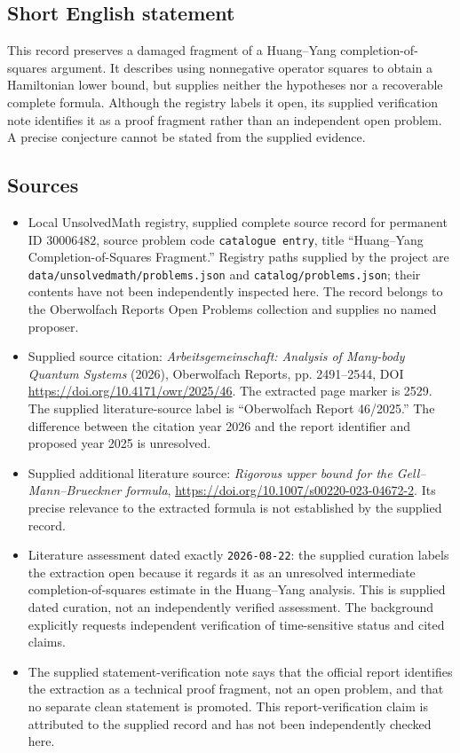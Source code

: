 \documentclass[11pt]{article}
\begin{document}
\subsection{Short English statement}
This record preserves a damaged fragment of a Huang--Yang completion-of-squares argument. It describes using nonnegative operator squares to obtain a Hamiltonian lower bound, but supplies neither the hypotheses nor a recoverable complete formula. Although the registry labels it open, its supplied verification note identifies it as a proof fragment rather than an independent open problem. A precise conjecture cannot be stated from the supplied evidence.
\subsection{Sources}
\begin{itemize}
\item Local UnsolvedMath registry, supplied complete source record for permanent ID \(30006482\), source problem code \texttt{catalogue entry}, title ``Huang--Yang Completion-of-Squares Fragment.'' Registry paths supplied by the project are \texttt{data/unsolvedmath/problems.json} and \texttt{catalog/problems.json}; their contents have not been independently inspected here. The record belongs to the Oberwolfach Reports Open Problems collection and supplies no named proposer.
\item Supplied source citation: \emph{Arbeitsgemeinschaft: Analysis of Many-body Quantum Systems} (2026), Oberwolfach Reports, pp. 2491--2544, DOI \url{https://doi.org/10.4171/owr/2025/46}. The extracted page marker is 2529. The supplied literature-source label is ``Oberwolfach Report 46/2025.'' The difference between the citation year 2026 and the report identifier and proposed year 2025 is unresolved.
\item Supplied additional literature source: \emph{Rigorous upper bound for the Gell--Mann--Brueckner formula}, \url{https://doi.org/10.1007/s00220-023-04672-2}. Its precise relevance to the extracted formula is not established by the supplied record.
\item Literature assessment dated exactly \texttt{2026-08-22}: the supplied curation labels the extraction open because it regards it as an unresolved intermediate completion-of-squares estimate in the Huang--Yang analysis. This is supplied dated curation, not an independently verified assessment. The background explicitly requests independent verification of time-sensitive status and cited claims.
\item The supplied statement-verification note says that the official report identifies the extraction as a technical proof fragment, not an open problem, and that no separate clean statement is promoted. This report-verification claim is attributed to the supplied record and has not been independently checked here.
\end{itemize}
\end{document}
